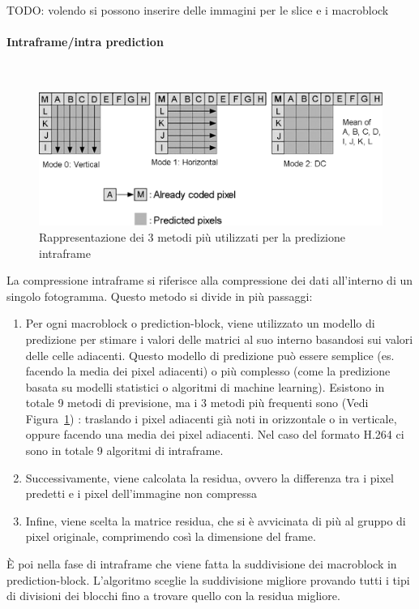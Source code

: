 \documentclass[a4paper,12pt, oneside]{article}
\begin{document}
TODO: volendo si possono inserire delle immagini per le slice e i macroblock

\paragraph{Intraframe/intra prediction}\hphantom{A}\\
\begin{figure}[h]
    \centering
    \includegraphics[width=1\textwidth]{images/intraframe-algo.png}
    \caption{Rappresentazione dei 3 metodi più utilizzati per la predizione intraframe}
    \label{fig:intraframe_algo}
\end{figure}

\noindent La compressione intraframe si riferisce alla compressione dei dati all'interno di
un singolo fotogramma. Questo metodo si divide in più passaggi:
\begin{enumerate}
  \item Per ogni macroblock o prediction-block, viene utilizzato un modello di predizione per stimare
  i valori delle matrici al suo interno basandosi sui valori delle celle adiacenti. Questo modello di
  predizione può essere semplice (es. facendo la media dei pixel adiacenti) o più complesso (come la
  predizione basata su modelli statistici o algoritmi di machine learning). Esistono in totale 9 metodi
  di previsione, ma i 3 metodi più frequenti sono (Vedi Figura~\ref{fig:intraframe_algo}) : traslando
  i pixel adiacenti già noti in orizzontale o in verticale, oppure facendo una media dei pixel adiacenti. Nel
  caso del formato H.264 ci sono in totale 9 algoritmi di intraframe.
  \item Successivamente, viene calcolata la residua, ovvero la differenza tra i pixel predetti e i
  pixel dell'immagine non compressa
  \item Infine, viene scelta la matrice residua, che si è avvicinata di più al gruppo di pixel originale,
  comprimendo così la dimensione del frame.
\end{enumerate}
È poi nella fase di intraframe che viene fatta la suddivisione dei macroblock in prediction-block.
L'algoritmo sceglie la suddivisione migliore provando tutti i tipi di divisioni dei
blocchi fino a trovare quello con la residua migliore.
\end{document}
